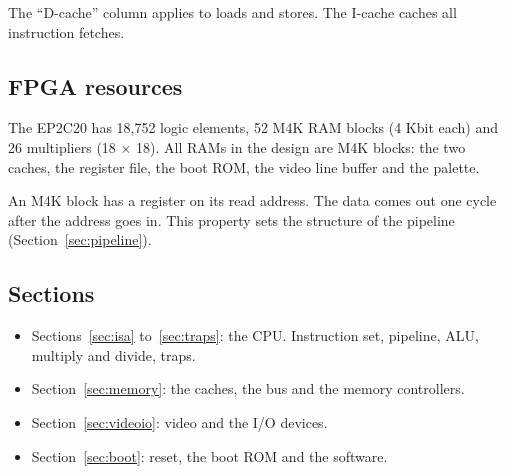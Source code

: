 The ``D-cache'' column applies to loads and stores. The I-cache caches all instruction fetches.

\subsection{FPGA resources}

The EP2C20 has 18,752 logic elements, 52 M4K RAM blocks (4 Kbit each) and 26 multipliers (18 $\times$ 18). All RAMs in the design are M4K blocks: the two caches, the register file, the boot ROM, the video line buffer and the palette.

An M4K block has a register on its read address. The data comes out one cycle after the address goes in. This property sets the structure of the pipeline (Section~\ref{sec:pipeline}).

\subsection{Sections}

\begin{itemize}
  \item Sections~\ref{sec:isa} to~\ref{sec:traps}: the CPU. Instruction set, pipeline, ALU, multiply and divide, traps.
  \item Section~\ref{sec:memory}: the caches, the bus and the memory controllers.
  \item Section~\ref{sec:videoio}: video and the I/O devices.
  \item Section~\ref{sec:boot}: reset, the boot ROM and the software.
\end{itemize}
